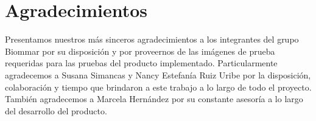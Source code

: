 \documentclass[journal]{IEEEtran}
\begin{document}
\section{Agradecimientos}
\begin{par}
Presentamos nuestros más sinceros agradecimientos a los integrantes del grupo Biommar por su disposición y por proveernos de las imágenes de prueba requeridas para las pruebas del producto implementado. Particularmente agradecemos a Susana Simancas y Nancy Estefanía Ruiz Uribe por la disposición,  colaboración y tiempo que brindaron a este trabajo a lo largo de todo el proyecto. También agradecemos a Marcela Hernández por su constante asesoría a lo largo del desarrollo del producto.
\end{par}











\end{document}

